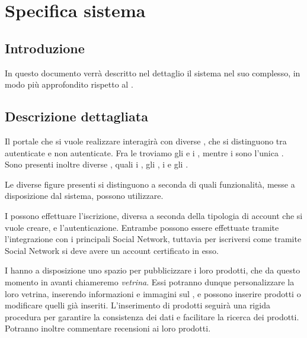 \chapter{Specifica sistema} 
\label{cha:specifica_sistema}

\section{Introduzione} 
In questo documento verrà descritto nel dettaglio il sistema nel suo complesso, in modo più approfondito rispetto al .

\section{Descrizione dettagliata} 
\label{sec:descrizione_dettagliata}
Il portale che si vuole realizzare interagirà con diverse , che si distinguono tra autenticate e non autenticate. Fra le  troviamo gli  e i , mentre i  sono l'unica .
Sono presenti inoltre diverse , quali i , gli , i  e gli .

\bigskip
\noindent
Le diverse figure presenti si distinguono a seconda di quali funzionalità, messe a disposizione dal sistema, possono utilizzare.

I  possono effettuare l'iscrizione, diversa a seconda della tipologia di account che si vuole creare, e l'autenticazione. Entrambe possono essere effettuate tramite l'integrazione con i principali Social Network, tuttavia per iscriversi come  tramite Social Network si deve avere un account certificato in esso.

I  hanno a disposizione uno spazio per pubblicizzare i loro prodotti, che da questo momento in avanti chiameremo \emph{vetrina}. Essi potranno dunque personalizzare la loro vetrina, inserendo informazioni e immagini sul , e possono inserire prodotti o modificare quelli già inseriti. L'inserimento di prodotti seguirà una rigida procedura per garantire la consistenza dei dati e facilitare la ricerca dei prodotti. Potranno inoltre commentare recensioni ai loro prodotti.

